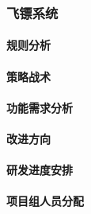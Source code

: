 \subsubsection{飞镖系统}

    \paragraph{规则分析}
    
    \paragraph{策略战术}
    
    \paragraph{功能需求分析}
    
    \paragraph{改进方向}

    \paragraph{研发进度安排}

    \paragraph{项目组人员分配}
    